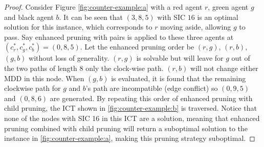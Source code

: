 \documentclass[english,10pt]{article}
\begin{document}
	\begin{proof}
		Consider Figure \ref{fig:counter-example:a} with a red agent $r$, green agent $g$ and black agent $b$. It can be seen that $(3,8,5)$ with SIC $16$ is an optimal solution for this instance, which corresponds to $r$ moving aside, allowing $g$ to pass.  Say enhanced pruning with pairs is applied to these three agents at $(c^*_r,c^*_g,c^*_b) = (0,8,5)$. Let the enhanced pruning order be $(r,g)$, $(r,b)$, $(g,b)$ without loss of generality. $(r,g)$ is solvable but will leave for $g$ out of the two paths of length $8$ only the clock-wise path. $(r,b)$ will not change either MDD in this node. When $(g,b)$ is evaluated, it is found that the remaining clockwise path for $g$ and $b$'s path are incompatible (edge conflict) so $(0,9,5)$ and $(0,8,6)$ are generated. By repeating this order of enhanced pruning with child pruning, the ICT shown in \ref{fig:counter-example:b} is traversed. Notice that none of the nodes with SIC 16 in this ICT are a solution, meaning that enhanced pruning combined with child pruning will return a suboptimal solution to the instance in \ref{fig:counter-example:a}, making this pruning strategy suboptimal.
	\end{proof}
	
\end{document}
